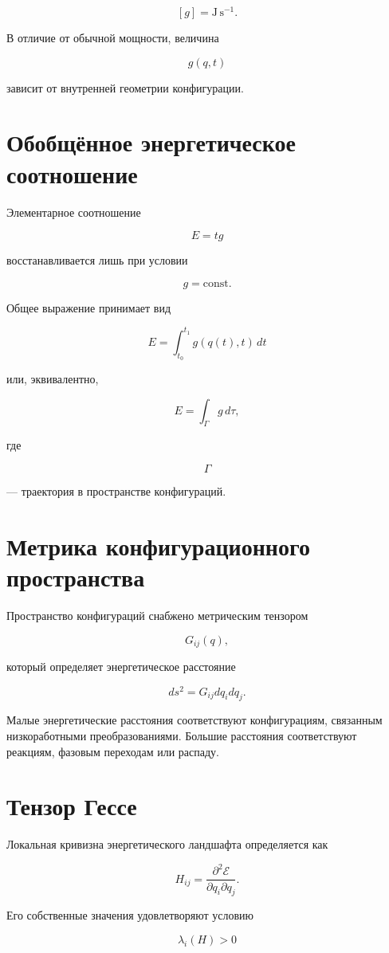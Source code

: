 \[ [g]=\mathrm{J\,s^{-1}}. \]

В отличие от обычной мощности, величина

\[ g(q,t) \]

зависит от внутренней геометрии конфигурации.

\section{Обобщённое энергетическое соотношение}

Элементарное соотношение

\[ E=tg \]

восстанавливается лишь при условии

\[ g=\mathrm{const}. \]

Общее выражение принимает вид

\[ \boxed{ E= \int_{t_0}^{t_1} g(q(t),t)\,dt } \]

или, эквивалентно,

\[ E= \int_\Gamma g\,d\tau, \]

где

\[ \Gamma \]

— траектория в пространстве конфигураций.

\section{Метрика конфигурационного пространства}

Пространство конфигураций снабжено метрическим тензором

\[ G_{ij}(q), \]

который определяет энергетическое расстояние

\[ ds^2= G_{ij} dq_i dq_j. \]

Малые энергетические расстояния соответствуют конфигурациям, связанным низкоработными преобразованиями. Большие расстояния соответствуют реакциям, фазовым переходам или распаду.

\section{Тензор Гессе}

Локальная кривизна энергетического ландшафта определяется как

\[ H_{ij} = \frac{\partial^2\mathcal E} {\partial q_i\partial q_j}. \]

Его собственные значения удовлетворяют условию

\[ \lambda_i(H)>0 \]

